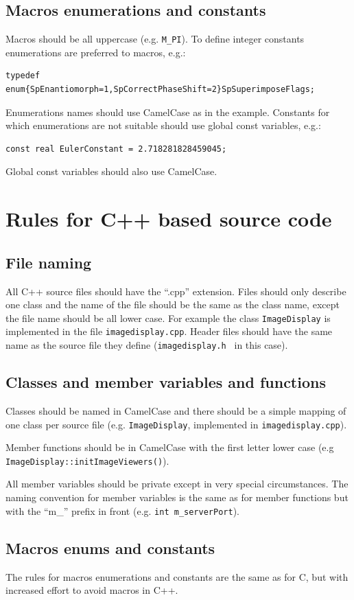 \documentclass[12pt]{article}
\newenvironment{sourcestyle}{}{}%
\begin{document}
\subsection{Macros enumerations and constants}
Macros should be all uppercase (e.g. {\tt M\_PI}). To define integer constants enumerations are preferred to macros, e.g.:
\begin{sourcestyle}
\begin{verbatim}
typedef enum{SpEnantiomorph=1,SpCorrectPhaseShift=2}SpSuperimposeFlags;
\end{verbatim}
\end{sourcestyle}
Enumerations names should use CamelCase as in the example. Constants for which enumerations are not suitable should use global const variables, e.g.:
\begin{sourcestyle}
\begin{verbatim}
const real EulerConstant = 2.718281828459045;
\end{verbatim}
\end{sourcestyle}
Global const variables should also use CamelCase.

\section{Rules for C++ based source code}
\subsection{File naming}
All C++ source files should have the ``.cpp'' extension. Files should only describe 
one class and the name of the file should be the same as the class name, except the file
name should be all lower case. For example the class {\tt ImageDisplay} is implemented in the file {\tt imagedisplay.cpp}. Header files should have the same name as the source file they define ({\tt imagedisplay.h } in this case).

\subsection{Classes and member variables and functions}
Classes should be named in CamelCase and there should be a simple mapping 
of one class per source file (e.g. {\tt ImageDisplay}, implemented in {\tt imagedisplay.cpp}).

Member functions should be in CamelCase with the first letter lower case (e.g {\tt ImageDisplay::initImageViewers()}).

All member variables should be private except in very special circumstances. 
The naming convention for member variables is the same as for member functions but with the ``m\_'' prefix in front (e.g. {\tt int m\_serverPort}).

\subsection{Macros enums and constants}
The rules for macros enumerations and constants are the same as for C, but with increased effort to avoid macros in C++.
\end{document}
